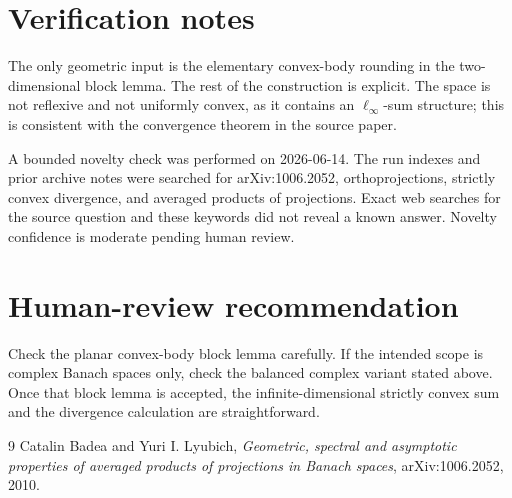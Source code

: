\documentclass[11pt]{article}
\begin{document}
\section*{Verification notes}

The only geometric input is the elementary convex-body rounding in the
two-dimensional block lemma.  The rest of the construction is explicit.  The
space is not reflexive and not uniformly convex, as it contains an
$\ell_\infty$-sum structure; this is consistent with the convergence theorem
in the source paper.

A bounded novelty check was performed on 2026-06-14.  The run indexes and
prior archive notes were searched for arXiv:1006.2052, orthoprojections,
strictly convex divergence, and averaged products of projections.  Exact web
searches for the source question and these keywords did not reveal a known
answer.  Novelty confidence is moderate pending human review.

\section*{Human-review recommendation}

Check the planar convex-body block lemma carefully.  If the intended scope is
complex Banach spaces only, check the balanced complex variant stated above.
Once that block lemma is accepted, the infinite-dimensional strictly convex
sum and the divergence calculation are straightforward.

\begin{thebibliography}{9}
Catalin Badea and Yuri I. Lyubich,
\emph{Geometric, spectral and asymptotic properties of averaged products of
projections in Banach spaces},
arXiv:1006.2052, 2010.
\end{thebibliography}
\end{document}
